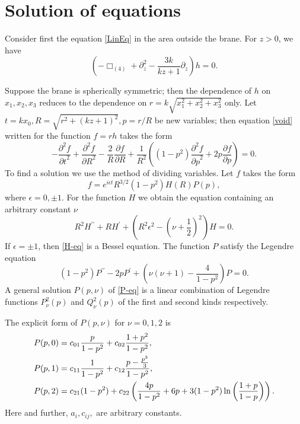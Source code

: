 \documentclass[letterpaper,12pt]{article}
\begin{document}
\section{Solution of equations}\label{solution}
Consider first the equation \eqref{LinEq} in the area outside the
brane.  For $z>0$, we have
 \begin{equation}
\label{void}
  \left(-\Box_{(4)} + \partial_z^2 -
 \frac{3k}{kz+1}\partial_z\right)h = 0.
\end{equation}

Suppose the brane is spherically symmetric; then the dependence of
$h$ on $x_1,x_2,x_3$ reduces to the dependence on
$r=k\sqrt{x_1^2+x_2^2+x_3^2}$ only. Let  $t=kx_0,
R=\sqrt{r^2+(kz+1)^2}, p=r/R$ be new variables; then equation
\eqref{void} written for the function $f=rh$ takes the form
\begin {equation}
\label{tRp-eq} -\frac{\partial^2 f}{{\partial t}^2}+
\frac{\partial^2 f}{{\partial R}^2}- \frac{2}{R}\frac{\partial
f}{\partial R}+\frac{1}{R^2}\left((1-p^2)\frac{\partial^2
f}{{\partial p}^2} +2p\frac{\partial f}{\partial p}\right)=0.
\end{equation}
To find a solution we use the method of dividing variables. Let
$f$ takes the form
\begin {equation}
\label{ansatz}
 f=e^{i\epsilon t}R^{3/2}(1-p^2)H(R)P(p),
\end{equation}
where $\epsilon=0,\pm1$. For the function $H$  we obtain the
equation containing an arbitrary constant  $\nu$
\begin{equation}
\label{H-eq}
 R^2H^{\prime\prime}+RH^{\prime}+\left(R^2\epsilon^2
 -\left(\nu+\frac{1}{2}\right)^2\right)H=0.
\end{equation}
If $\epsilon=\pm1$, then \eqref{H-eq} is a Bessel equation. The
function $P$ satisfy the  Legendre equation
\begin {equation}
\label{P-eq} (1-p^2)P^{\prime\prime}-2pP^{\prime}+
\left(\nu(\nu+1)-\frac{4}{1-p^2}\right)P=0.
\end{equation}
A general solution $P(p,\nu)$ of \eqref{P-eq} is a linear
combination of Legendre functions $P^2_\nu(p)$ and $Q^2_\nu(p)$ of
the first and second kinds respectively.

The explicit form of $P(p,\nu)$ for  $\nu=0, 1, 2$ is
\begin{align}
P(p,0)&=c_{01}\frac{p}{1-p^2}+c_{02}\frac{1+p^2}{1-p^2},\notag\\
\label{P(p,nu=0,1,2)}
P(p,1)&=c_{11}\frac{1}{1-p^2}+c_{12}\frac{p-\frac{p^3}{3}}{1-p^2},\\
P(p,2)&=c_{21}(1-p^2) + c_{22}\left(\frac{4p}{1-p^2}+6p+3(1-p^2)
\ln\left(\frac{1+p}{1-p}\right)\right)\notag.
\end{align}
Here and further,  $a_i,c_{ij},$  are arbitrary constants.
\end{document}
